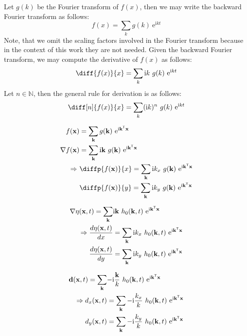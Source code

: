 Let $g(k)$ be the Fourier transform of $f(x)$, then we may write the
backward Fourier transform as follows:
\begin{equation}
 f(x) = \sum_{k}g(k)~\mathrm{e}^{\mathrm{i}kt}
\end{equation}
Note, that we omit the scaling factors involved in the Fourier transform
because in the context of this work they are not needed.
Given the backward Fourier transform, we may compute the derivative of $f(x)$
as follows:
\begin{equation}
  \diff{f(x)}{x} = \sum_{k}\mathrm{i}k~g(k)~\mathrm{e}^{\mathrm{i}kt}
\end{equation}
Let $n \in \mathbb{N}$, then the general rule for derivation is as follows:
\begin{equation}
  \diff[n]{f(x)}{x} = \sum_{k}(\mathrm{i}k)^n~g(k)~\mathrm{e}^{\mathrm{i}kt}
\end{equation}


\begin{align}
 f(\mvec{x}) &= \sum_{\mvec{k}}g(\mvec{k})~\mathrm{e}^{\mathrm{i}\transpose{\mvec{k}}\mvec{x}} \\
 \nabla f(\mvec{x}) &= \sum_{\mvec{k}}\mathrm{i}\mvec{k}~g(\mvec{k})~\mathrm{e}^{\mathrm{i}\transpose{\mvec{k}}\mvec{x}} \\
 \Rightarrow~&\diffp{f(\mvec{x})}{x} = \sum_{\mvec{k}}\mathrm{i}k_{x}~g(\mvec{k})~\mathrm{e}^{\mathrm{i}\transpose{\mvec{k}}\mvec{x}} \\
 &\diffp{f(\mvec{x})}{y} = \sum_{\mvec{k}}\mathrm{i}k_{y}~g(\mvec{k})~\mathrm{e}^{\mathrm{i}\transpose{\mvec{k}}\mvec{x}}
\end{align}

\begin{align}
\nabla\eta(\mathbf{x},t) =
\sum_{\mathbf{k}}&\mathrm{i}\mathbf{k}~h_0(\mathbf{k},t)
~\mathrm{e}^{\mathrm{i}\mathbf{k}^{\mathsf{T}}\mathbf{x}} \\
\Rightarrow \frac{d\eta(\mathbf{x},t)}{dx} &=
\sum_{\mathbf{k}}\mathrm{i}k_x~h_0(\mathbf{k},t)
~\mathrm{e}^{\mathrm{i}\mathbf{k}^{\mathsf{T}}\mathbf{x}} \\
\frac{d\eta(\mathbf{x},t)}{dy} &=
\sum_{\mathbf{k}}\mathrm{i}k_y~h_0(\mathbf{k},t)
~\mathrm{e}^{\mathrm{i}\mathbf{k}^{\mathsf{T}}\mathbf{x}}
\end{align}

\begin{align}
\mathbf{d}(\mathbf{x},t) =
\sum_{\mathbf{k}}&\mathrm{-i}\frac{\mathbf{k}}{k}~h_0(\mathbf{k},t)
~\mathrm{e}^{\mathrm{i}\mathbf{k}^{\mathsf{T}}\mathbf{x}} \\
\Rightarrow d_x(\mathbf{x},t) &=
\sum_{\mathbf{k}}\mathrm{-i}\frac{k_x}{k}~h_0(\mathbf{k},t)
~\mathrm{e}^{\mathrm{i}\mathbf{k}^{\mathsf{T}}\mathbf{x}} \\
d_y(\mathbf{x},t) &=
\sum_{\mathbf{k}}\mathrm{-i}\frac{k_y}{k}~h_0(\mathbf{k},t)
~\mathrm{e}^{\mathrm{i}\mathbf{k}^{\mathsf{T}}\mathbf{x}}
\end{align}

